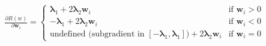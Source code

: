 \documentclass[preview]{standalone}
\begin{document}
\begin{align*}
\frac{\partial R(w)}{\partial \mathbf{w}_i} =\begin{cases}\mathbf{\lambda}_1 + 2\mathbf{\lambda}_2 \mathbf{w}_i & \text{if } \mathbf{w}_i > 0 \\-\mathbf{\lambda}_1 + 2\mathbf{\lambda}_2 \mathbf{w}_i & \text{if } \mathbf{w}_i < 0 \\\text{undefined (subgradient in } [-\mathbf{\lambda}_1, \mathbf{\lambda}_1]) + 2\mathbf{\lambda}_2 \mathbf{w}_i & \text{if } \mathbf{w}_i = 0\end{cases}
\end{align*}
\end{document}
